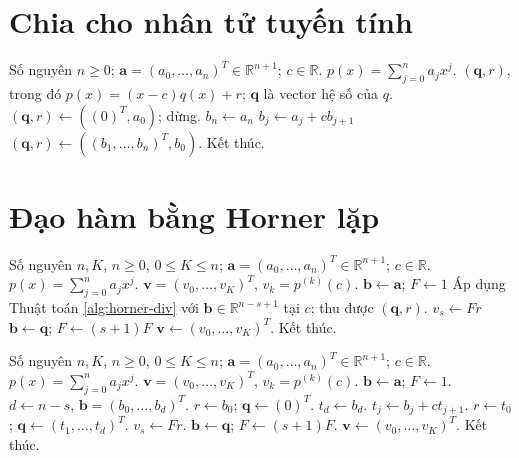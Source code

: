 \documentclass[12pt,a4paper,oneside]{book}
\numberwithin{algorithm}{chapter}
\theoremstyle{definition}
\newcommand{\R}{\mathbb{R}}
\begin{document}
\section{Chia cho nhân tử tuyến tính}
\begin{algorithm}[H]
\caption{Chia cho nhân tử tuyến tính bằng Horner}
\label{alg:horner-div}
\begin{algorithmic}[1]
\Require Số nguyên $n\geq0$; $\boldsymbol a=(a_0,\ldots,a_n)^T\in\R^{n+1}$; $c\in\R$. $p(x)=\sum_{j=0}^{n}a_jx^j$.
\Ensure $(\boldsymbol q,r)$, trong đó $p(x)=(x-c)q(x)+r$; $\boldsymbol q$ là vector hệ số của $q$.
  \State $(\boldsymbol q,r)\gets((0)^T,a_0)$; dừng.
\EndIf
\Statex
\State $b_n\gets a_n$
  \State $b_j\gets a_j+cb_{j+1}$
\EndFor
\Statex
\State $(\boldsymbol q,r)\gets((b_1,\ldots,b_n)^T,b_0)$.
\State Kết thúc.
\end{algorithmic}
\end{algorithm}

\section{Đạo hàm bằng Horner lặp}
\begin{algorithm}[H]
\caption{Tính đạo hàm bằng Horner lặp -- sơ lược}
\label{alg:horner-derivatives}
\begin{algorithmic}[1]
\Require Số nguyên $n,K$, $n\geq0$, $0\leq K\leq n$; $\boldsymbol a=(a_0,\ldots,a_n)^T\in\R^{n+1}$; $c\in\R$. $p(x)=\sum_{j=0}^{n}a_jx^j$.
\Ensure $\boldsymbol v=(v_0,\ldots,v_K)^T$, $v_k=p^{(k)}(c)$.
\State $\boldsymbol b\gets\boldsymbol a$; $F\gets1$
  \State Áp dụng Thuật toán \ref{alg:horner-div} với $\boldsymbol b\in\R^{n-s+1}$ tại $c$; thu được $(\boldsymbol q,r)$.
  \State $v_s\gets Fr$
  \State $\boldsymbol b\gets\boldsymbol q$; $F\gets(s+1)F$
\EndFor
\Statex
\State $\boldsymbol v\gets(v_0,\ldots,v_K)^T$.
\State Kết thúc.
\end{algorithmic}
\end{algorithm}

\begin{algorithm}[H]
\caption{Tính đạo hàm bằng Horner lặp -- chi tiết}
\label{alg:horner-derivatives-detailed}
\begin{algorithmic}[1]
\Require Số nguyên $n,K$, $n\geq0$, $0\leq K\leq n$; $\boldsymbol a=(a_0,\ldots,a_n)^T\in\R^{n+1}$; $c\in\R$. $p(x)=\sum_{j=0}^{n}a_jx^j$.
\Ensure $\boldsymbol v=(v_0,\ldots,v_K)^T$, $v_k=p^{(k)}(c)$.
\State $\boldsymbol b\gets\boldsymbol a$; $F\gets1$.
  \State $d\gets n-s$, $\boldsymbol b=(b_0,\ldots,b_d)^T$.
    \State $r\gets b_0$; $\boldsymbol q\gets(0)^T$.
  \Else
    \State $t_d\gets b_d$.
      \State $t_j\gets b_j+ct_{j+1}$.
    \EndFor
\Statex
    \State $r\gets t_0$; $\boldsymbol q\gets(t_1,\ldots,t_d)^T$.
  \EndIf
\Statex
  \State $v_s\gets Fr$.
  \State $\boldsymbol b\gets\boldsymbol q$; $F\gets(s+1)F$.
\EndFor
\Statex
\State $\boldsymbol v\gets(v_0,\ldots,v_K)^T$.
\State Kết thúc.
\end{algorithmic}
\end{algorithm}
\end{document}
